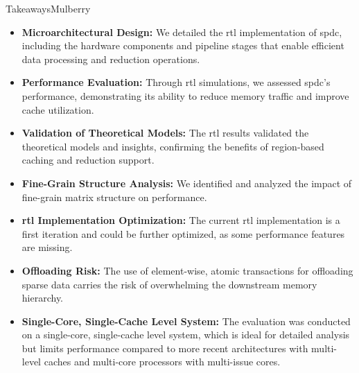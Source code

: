\begin{highlight}{Takeaways}{Mulberry}
    \begin{itemize}
        \item \textbf{Microarchitectural Design:} We detailed the \acrshort{rtl} implementation of \acrlong{spdc}, including the hardware components and \gls{pipeline} stages that enable efficient data processing and \gls{reduction} operations.
        \item \textbf{Performance Evaluation:} Through \acrshort{rtl} simulations, we assessed \acrlong{spdc}'s performance, demonstrating its ability to reduce memory traffic and improve cache utilization.
        \item \textbf{Validation of Theoretical Models:} The \acrshort{rtl} results validated the theoretical models and insights, confirming the benefits of region-based caching and \gls{reduction} support.
        \item \textbf{Fine-Grain Structure Analysis:} We identified and analyzed the impact of fine-grain matrix structure on performance.
    \end{itemize}

    \bigskip
    \begin{itemize}
        \item \textbf{\acrshort{rtl} Implementation Optimization:} The current \acrshort{rtl} implementation is a first iteration and could be further optimized, as some performance features are missing.
        \item \textbf{Offloading Risk:} The use of element-wise, atomic transactions for offloading sparse data carries the risk of overwhelming the downstream memory hierarchy.
        \item \textbf{Single-Core, Single-Cache Level System:} The evaluation was conducted on a single-core, single-cache level system, which is ideal for detailed analysis but limits performance compared to more recent architectures with multi-level caches and multi-core processors with multi-issue cores.
    \end{itemize}
\end{highlight}

\clearpage